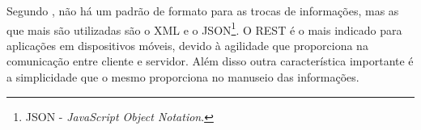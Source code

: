 	\par Segundo , não há um padrão de formato para as
trocas de informações, mas as que mais são utilizadas são o XML e o
JSON\footnote{JSON - \textit{JavaScript Object Notation}.}. O REST é o mais
indicado para aplicações em dispositivos móveis, devido à agilidade que 
proporciona na comunicação entre cliente e servidor. Além disso outra
característica importante é a simplicidade que o mesmo proporciona no manuseio
das informações.
